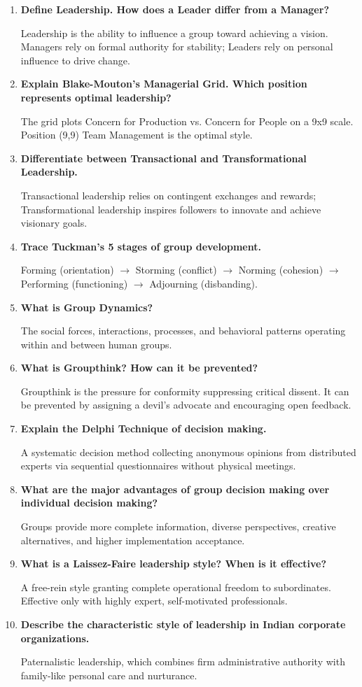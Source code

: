 \documentclass[12pt,a4paper]{article}
\newcommand{\Q}[1]{\textbf{#1}\par\noindent\ignorespaces}
\begin{document}
\begin{tcolorbox}[exambox, title={\textbf{Frequently Asked / Viva Questions}}]
\begin{enumerate}[leftmargin=*, itemsep=4pt]
  \item \Q{Define Leadership. How does a Leader differ from a Manager?}
    Leadership is the ability to influence a group toward achieving a vision. Managers rely on formal authority for stability; Leaders rely on personal influence to drive change.
  
  \item \Q{Explain Blake-Mouton's Managerial Grid. Which position represents optimal leadership?}
    The grid plots Concern for Production vs. Concern for People on a 9x9 scale. Position (9,9) Team Management is the optimal style.
  
  \item \Q{Differentiate between Transactional and Transformational Leadership.}
    Transactional leadership relies on contingent exchanges and rewards; Transformational leadership inspires followers to innovate and achieve visionary goals.
  
  \item \Q{Trace Tuckman's 5 stages of group development.}
    Forming (orientation) $\to$ Storming (conflict) $\to$ Norming (cohesion) $\to$ Performing (functioning) $\to$ Adjourning (disbanding).
  
  \item \Q{What is Group Dynamics?}
    The social forces, interactions, processes, and behavioral patterns operating within and between human groups.
  
  \item \Q{What is Groupthink? How can it be prevented?}
    Groupthink is the pressure for conformity suppressing critical dissent. It can be prevented by assigning a devil's advocate and encouraging open feedback.
  
  \item \Q{Explain the Delphi Technique of decision making.}
    A systematic decision method collecting anonymous opinions from distributed experts via sequential questionnaires without physical meetings.
  
  \item \Q{What are the major advantages of group decision making over individual decision making?}
    Groups provide more complete information, diverse perspectives, creative alternatives, and higher implementation acceptance.
  
  \item \Q{What is a Laissez-Faire leadership style? When is it effective?}
    A free-rein style granting complete operational freedom to subordinates. Effective only with highly expert, self-motivated professionals.
  
  \item \Q{Describe the characteristic style of leadership in Indian corporate organizations.}
    Paternalistic leadership, which combines firm administrative authority with family-like personal care and nurturance.
\end{enumerate}
\end{tcolorbox}
\end{document}
